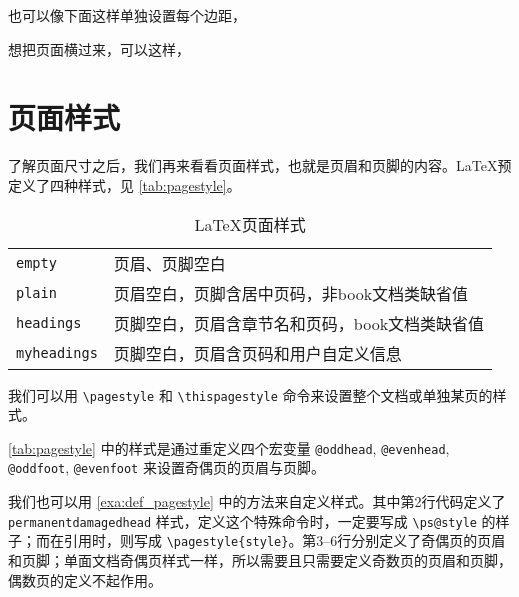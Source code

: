 也可以像下面这样单独设置每个边距，

\begin{Code}[]
\usepackage[top=2in, bottom=1in, left=1in, right=1in]{geometry}
\end{Code}

想把页面横过来，可以这样，

\begin{Code}[]
\usepackage[landscape]{geometry}
\end{Code}

\section{页面样式}

了解页面尺寸之后，我们再来看看页面样式，也就是页眉和页脚的内容。\LaTeX 预定义了四种样式，见 \autoref{tab:pagestyle}。

\begin{table}[htbp]
\caption{\LaTeX 页面样式}
\label{tab:pagestyle}
\centering
\begin{tabular}{ll}
  \toprule
  \texttt{empty} & 页眉、页脚空白 \\
  \texttt{plain} & 页眉空白，页脚含居中页码，非book文档类缺省值 \\
  \texttt{headings} & 页脚空白，页眉含章节名和页码，book文档类缺省值 \\
  \texttt{myheadings} & 页脚空白，页眉含页码和用户自定义信息 \\
  \bottomrule
\end{tabular}
\end{table}

我们可以用 \verb|\pagestyle| 和 \verb|\thispagestyle| 命令来设置整个文档或单独某页的样式。

\begin{Code}[numbers=none]
\pagestyle{plain}    %
\thispagestyle{empty}%
\end{Code}

\autoref{tab:pagestyle} 中的样式是通过重定义四个宏变量 \texttt{@oddhead}, \texttt{@evenhead}, \texttt{@oddfoot}, \texttt{@evenfoot} 来设置奇偶页的页眉与页脚。

我们也可以用 \autoref{exa:def_pagestyle} 中的方法来自定义样式。其中第2行代码定义了 \texttt{permanentdamagedhead} 样式，定义这个特殊命令时，一定要写成 \verb|\ps@style| 的样子；而在引用时，则写成 \verb|\pagestyle{style}|。第3--6行分别定义了奇偶页的页眉和页脚；单面文档奇偶页样式一样，所以需要且只需要定义奇数页的页眉和页脚，偶数页的定义不起作用。

